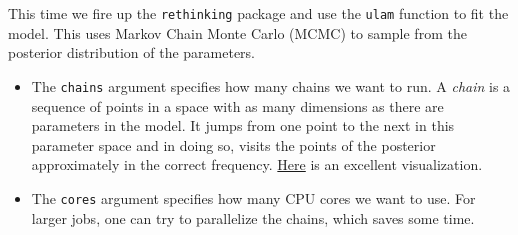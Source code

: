 \documentclass[
]{book}
\begin{document}
This time we fire up the \texttt{rethinking} package and use the \texttt{ulam} function
to fit the model.
This uses Markov Chain Monte Carlo (MCMC) to sample from the posterior
distribution of the parameters.

\begin{itemize}
\item
  The \texttt{chains} argument specifies how many chains we want to run.
  A \emph{chain} is a sequence of points in a space with as many dimensions as there
  are parameters in the model. It jumps from one point to the next in this parameter
  space and in doing so, visits the points of the posterior approximately in the correct
  frequency. \href{https://mbjoseph.github.io/posts/2018-12-25-animating-the-metropolis-algorithm/}{Here}
  is an excellent visualization.
\item
  The \texttt{cores} argument specifies how many CPU cores we want to use.
  For larger jobs, one can try to parallelize
  the chains, which saves some time.
\end{itemize}
\end{document}
